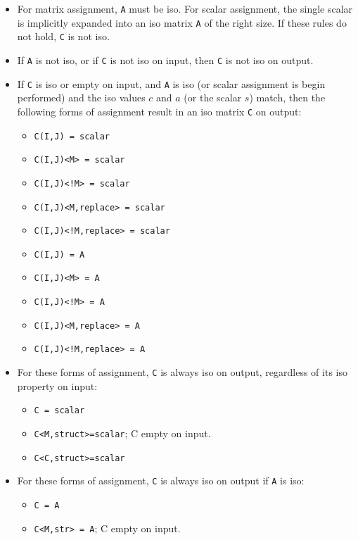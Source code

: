 \documentclass[12pt]{article}
\begin{document}
\begin{itemize}
\item 
For matrix assignment, \verb'A' must be iso.  For scalar assignment, the single
scalar is implicitly expanded into an iso matrix \verb'A' of the right size.
If these rules do not hold, \verb'C' is not iso.

\item
If \verb'A' is not iso, or if \verb'C' is not iso on input, then \verb'C' is
not iso on output.

\item
If \verb'C' is iso or empty on input, and \verb'A' is iso (or scalar assignment
is begin performed) and the iso values $c$ and $a$ (or the scalar $s$) match,
then the following forms of assignment result in an iso matrix \verb'C'  on
output:

                \begin{itemize}
                \item \verb'C(I,J) = scalar'
                \item \verb'C(I,J)<M> = scalar'
                \item \verb'C(I,J)<!M> = scalar'
                \item \verb'C(I,J)<M,replace> = scalar'
                \item \verb'C(I,J)<!M,replace> = scalar'
                \item \verb'C(I,J) = A'
                \item \verb'C(I,J)<M> = A'
                \item \verb'C(I,J)<!M> = A'
                \item \verb'C(I,J)<M,replace> = A'
                \item \verb'C(I,J)<!M,replace> = A'
                \end{itemize}

\item
For these forms of assignment, \verb'C' is always iso on output, regardless
of its iso property on input:

                \begin{itemize}
                \item \verb'C = scalar'
                \item \verb'C<M,struct>=scalar'; C empty on input.
                \item \verb'C<C,struct>=scalar'
                \end{itemize}

\item
For these forms of assignment, \verb'C' is always iso on output if \verb'A'
is iso:

                \begin{itemize}
                \item \verb'C = A'
                \item \verb'C<M,str> = A'; C empty on input.
                \end{itemize}
\end{itemize}
\end{document}
